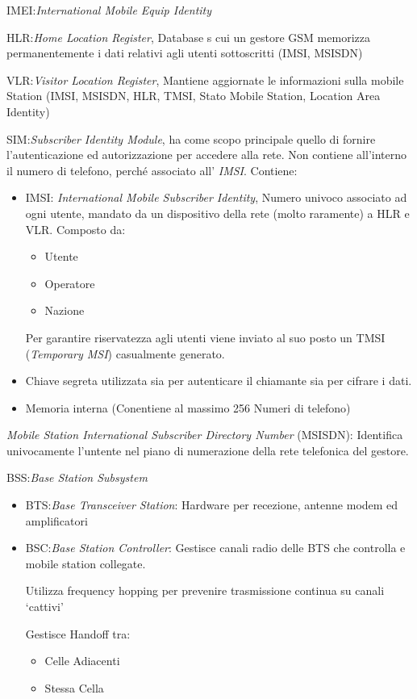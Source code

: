 \documentclass{article}
\begin{document}
IMEI:\@\textit{International Mobile Equip Identity}

HLR:\@\textit{Home Location Register}, Database s cui un gestore GSM memorizza permanentemente i dati relativi agli utenti sottoscritti (IMSI, MSISDN)

VLR:\@\textit{Visitor Location Register}, Mantiene aggiornate le informazioni sulla mobile Station (IMSI, MSISDN, HLR, TMSI, Stato Mobile Station, Location Area Identity)

SIM:\@\textit{Subscriber Identity Module}, ha come scopo principale quello di fornire l'autenticazione ed autorizzazione per accedere alla rete. Non contiene all'interno il numero di telefono, perch\'e associato all' \textit{IMSI}. Contiene:

\begin{itemize}
    \item IMSI: \textit{International Mobile Subscriber Identity}, Numero univoco associato ad ogni utente, mandato da un dispositivo della rete (molto raramente) a HLR e VLR. Composto da:
        \begin{itemize}
            \item Utente
            \item Operatore
            \item Nazione
        \end{itemize}
        Per garantire riservatezza agli utenti viene inviato al suo posto un TMSI (\textit{Temporary MSI}) casualmente generato.
    \item Chiave segreta utilizzata sia per autenticare il chiamante sia per cifrare i dati.
    \item Memoria interna (Conentiene al massimo 256 Numeri di telefono)
\end{itemize}


\textit{Mobile Station International Subscriber Directory Number} (MSISDN): Identifica univocamente l'untente nel piano di numerazione della rete telefonica del gestore.

BSS:\@\textit{Base Station Subsystem}

\begin{itemize}
    \item BTS:\@\textit{Base Transceiver Station}: Hardware per recezione, antenne modem ed amplificatori
    \item BSC:\@\textit{Base Station Controller}: Gestisce canali radio delle BTS che controlla e mobile station collegate.

        Utilizza frequency hopping per prevenire trasmissione continua su canali `cattivi'

        Gestisce Handoff tra:
        \begin{itemize}
            \item Celle Adiacenti
            \item Stessa Cella
        \end{itemize}
\end{itemize}
\end{document}

